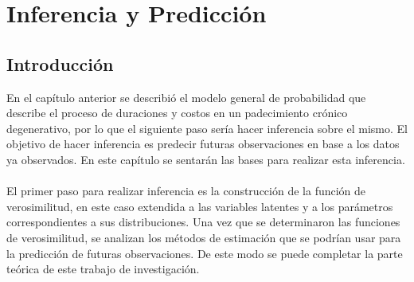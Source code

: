\chapter{Inferencia y Predicci\'on}
\section{Introducci\'on}
En el cap\'itulo anterior se describi\'o el modelo general de probabilidad que describe el proceso de duraciones y costos en un padecimiento cr\'onico degenerativo, por lo que el siguiente paso ser\'ia hacer inferencia sobre el mismo. El objetivo de hacer inferencia es predecir futuras observaciones en base a los datos ya observados. En este cap\'itulo se sentar\'an las bases para realizar esta inferencia.\\
\\
El primer paso para realizar inferencia es la construcci\'on de la funci\'on de verosimilitud, en este caso extendida a las variables latentes y a los par\'ametros correspondientes a sus distribuciones. Una vez que se determinaron las funciones de verosimilitud, se analizan los m\'etodos de estimaci\'on que se podr\'ian usar para la predicci\'on de futuras observaciones. De este modo se puede completar la parte te\'orica de este trabajo de investigaci\'on.
